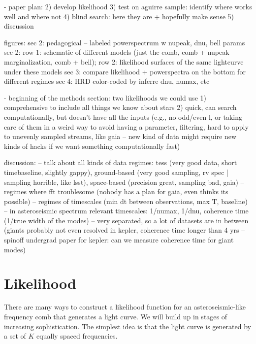 \documentclass[modern]{aastex63}
\begin{document}
- paper plan:
2) develop likelihood
3) test on aguirre sample: identify where works well and where not
4) blind search: here they are + hopefully make sense
5) discussion


figures:
sec 2: pedagogical -- labeled powerspectrum w nupeak, dnu, bell params 
sec 2: row 1: schematic of different models (just the comb, comb + nupeak marginalization, comb + bell); row 2: likelihood surfaces of the same lightcurve under these models
sec 3: compare likelihood + powerspectra on the bottom for different regimes
sec 4: HRD color-coded by inferre dnu, numax, etc


- beginning of the methods section: two likelihoods we could use
1) comprehensive to include all things we know about stars
2) quick, can search computationally, but doesn't have all the inputs (e.g., no odd/even l, or taking care of them in a weird way to avoid having a parameter, filtering, hard to apply to unevenly sampled streams, like gaia -- new kind of data might require new kinds of hacks if we want something computationally fast)


discussion:
-- talk about all kinds of data regimes: tess (very good data, short timebaseline, slightly gappy), ground-based (very good sampling, rv spec | sampling horrible, like lsst), space-based (precision great, sampling bad, gaia) -- regimes where fft troublesome (nobody has a plan for gaia, even thinks its possible)
-- regimes of timescales (min dt between observations, max T, baseline)
-- in asteroseismic spectrum relevant timescales: 1/numax, 1/dnu, coherence time (1/true width of the modes) -- very separated, so a lot of datasets are in between (giants probably not even resolved in kepler, coherence time longer than 4 yrs -- spinoff undergrad paper for kepler: can we measure coherence time for giant modes)


\section{Likelihood}
\label{sec:lhood}

There are many ways to construct a likelihood function for an
asteroseismic-like frequency comb that generates a light curve.
We will build up in stages of increasing sophistication.
The simplest idea is that the light curve is generated by a set of
$K$ equally spaced frequencies.
\end{document}
